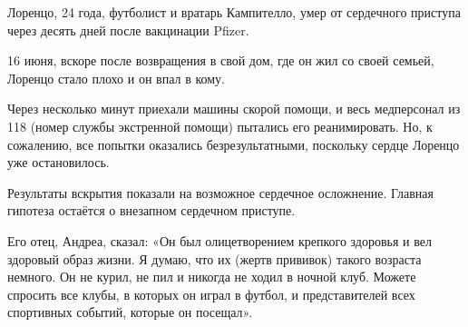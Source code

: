 Лоренцо, 24 года, футболист и вратарь Кампителло, умер от сердечного приступа
через десять дней после вакцинации Pfizer.

16 июня, вскоре после возвращения в свой дом, где он жил со своей семьей,
Лоренцо стало плохо и он впал в кому.

Через несколько минут приехали машины скорой помощи, и весь медперсонал из 118
(номер службы экстренной помощи) пытались его реанимировать. Но, к сожалению,
все попытки оказались безрезультатными, поскольку сердце Лоренцо уже
остановилось.

Результаты вскрытия показали на возможное сердечное осложнение. Главная гипотеза
остаётся о внезапном сердечном приступе.

Его отец, Андреа, сказал: «Он был олицетворением крепкого здоровья и вел
здоровый образ жизни. Я думаю, что их (жертв прививок) такого возраста
немного. Он не курил, не пил и никогда не ходил в ночной клуб. Можете спросить
все клубы, в которых он играл в футбол, и представителей всех спортивных
событий, которые он посещал».


